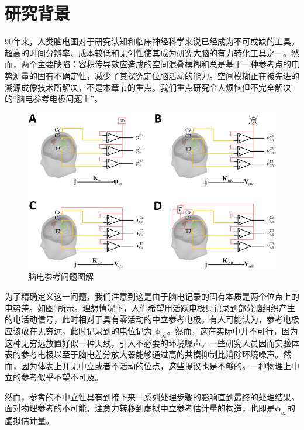 \section{研究背景}
90年来，人类脑电图对于研究认知和临床神经科学来说已经成为不可或缺的工具。超高的时间分辨率、成本较低和无创性使其成为研究大脑的有力转化工具之一。然而，两个主要缺陷：容积传导效应造成的空间混叠模糊和总是基于一种参考点的电势测量的固有不确定性，减少了其探究定位脑活动的能力。空间模糊正在被先进的溯源成像技术所解决，不是本章节的重点。我们重点研究令人烦恼但不完全解决的“脑电参考电极问题上”。
\begin{figure}[!ht]
	\centering
	\includegraphics[width=15cm]{pic/Frontier/figure1.png}
	\caption{脑电参考问题图解}
	\label{3.1}
\end{figure}
为了精确定义这一问题，我们注意到这是由于脑电记录的固有本质是两个位点上的电势差。如图\ref{3.1}所示。理想情况下，人们希望用活跃电极只记录到部分脑组织产生的电活动信号，此时相对于具有零活动的中立参考电极。有人可能认为，参考电极应该放在无穷远，此时记录到的电位记为 $\mathbf{\phi}_{\infty}$。然而，这在实际中并不可行，因为这种无穷远放置好似一种天线，引入不必要的环境噪声。一些研究人员因而实验体表的参考电极以至于脑电差分放大器能够通过高的共模抑制比消除环境噪声。然而，因为体表上并无中立或者不活动的位点，这些提议也是不够的。一种物理上中立的参考似乎不望不可及。

然而，参考的不中立性具有到接下来一系列处理步骤的影响直到最终的处理结果。面对物理参考的不可能，注意力转移到虚拟中立参考估计量的构造，也即是$\mathbf{\phi}_{\infty}$的虚拟估计量。


